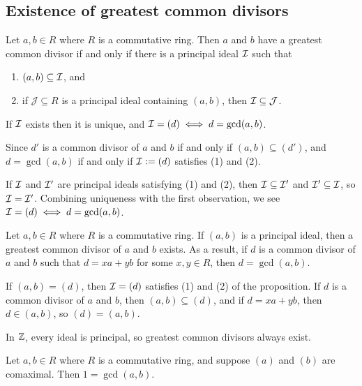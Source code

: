 \documentclass[12pt,letterpaper]{report}
\begin{document}
\pagebreak
\subsection{Existence of greatest common divisors}

\begin{prop}{}{}
  Let $a, b \in R$ where $R$ is a commutative ring.
  Then $a$ and $b$ have a greatest common divisor if and only if there is a principal ideal $\mathcal{I}$
  such that
  \begin{enumerate}
    \item $(a, b) \subseteq \mathcal{I}$, and
    \item if $\mathcal{J} \subseteq R$ is a principal ideal containing $(a, b)$, then
      $\mathcal{I} \subseteq \mathcal{J}$.
  \end{enumerate}
  If $\mathcal{I}$ exists then it is unique, and $\mathcal{I} = (d) \iff d = \gcd(a, b)$.
\end{prop}

\begin{thmproof}
  Since $d'$ is a common divisor of $a$ and $b$ if and only if $(a, b) \subseteq (d')$, and
  $d = \gcd(a, b)$ if and only if $\mathcal{I} := (d)$ satisfies (1) and (2).

  If $\mathcal{I}$ and $\mathcal{I}'$ are principal ideals satisfying (1) and (2), then
  $\mathcal{I} \subseteq \mathcal{I}'$ and $\mathcal{I}' \subseteq \mathcal{I}$, so $\mathcal{I} = \mathcal{I}'$.
  Combining uniqueness with the first observation, we see $\mathcal{I} = (d) \iff d = \gcd(a, b)$.
\end{thmproof}

\begin{cor}{}{}
  Let $a, b \in R$ where $R$ is a commutative ring.
  If $(a, b)$ is a principal ideal, then a greatest common divisor of $a$ and $b$ exists.
  As a result, if $d$ is a common divisor of $a$ and $b$ such that $d = xa + yb$ for some
  $x, y \in R$, then $d = \gcd(a, b)$.
\end{cor}

\begin{thmproof}
  If $(a, b) = (d)$, then $\mathcal{I} = (d)$ satisfies (1) and (2) of the proposition.
  If $d$ is a common divisor of $a$ and $b$, then $(a, b) \subseteq (d)$, and if $d = xa + yb$, then
  $d \in (a, b)$, so $(d) = (a, b)$.
\end{thmproof}

In $\mathbb{Z}$, every ideal is principal, so greatest common divisors always exist.

\begin{cor}{}{}
  Let $a, b \in R$ where $R$ is a commutative ring, and suppose $(a)$ and $(b)$ are comaximal.
  Then $1 = \gcd(a, b)$.
\end{cor}
\end{document}
